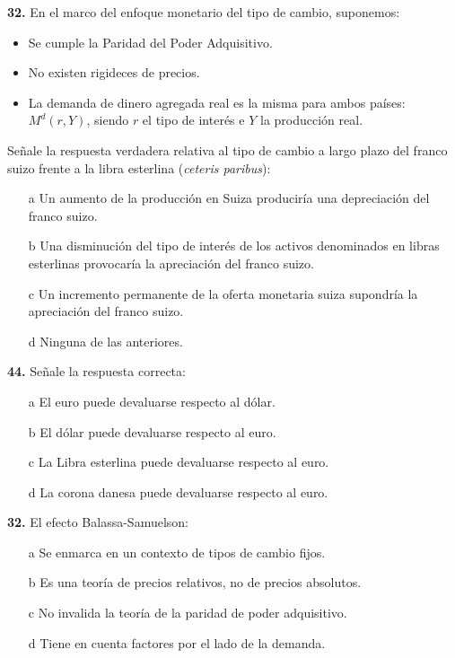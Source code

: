 \documentclass{nuevotema}
\begin{document}
\textbf{32.} En el marco del enfoque monetario del tipo de cambio, suponemos:

\begin{itemize}
	\item Se cumple la Paridad del Poder Adquisitivo.
	\item No existen rigideces de precios.
	\item La demanda de dinero agregada real es la misma para ambos países: $M^d (r, Y)$, siendo $r$ el tipo de interés e $Y$ la producción real.
\end{itemize}

Señale la respuesta verdadera relativa al tipo de cambio a largo plazo del franco suizo frente a la libra esterlina (\textit{ceteris paribus}):
\begin{enumerate}
	\item[a] Un aumento de la producción en Suiza produciría una depreciación del franco suizo.
	\item[b] Una disminución del tipo de interés de los activos denominados en libras esterlinas provocaría la apreciación del franco suizo.
	\item[c] Un incremento permanente de la oferta monetaria suiza supondría la apreciación del franco suizo.
	\item[d] Ninguna de las anteriores.
\end{enumerate}


\textbf{44.} Señale la respuesta correcta:
\begin{enumerate}
	\item[a] El euro puede devaluarse respecto al dólar.
	\item[b] El dólar puede devaluarse respecto al euro.
	\item[c] La Libra esterlina puede devaluarse respecto al euro.
	\item[d] La corona danesa puede devaluarse respecto al euro.
\end{enumerate}

\textbf{32.} El efecto Balassa-Samuelson:
\begin{itemize}
	\item[a] Se enmarca en un contexto de tipos de cambio fijos.
	\item[b] Es una teoría de precios relativos, no de precios absolutos.
	\item[c] No invalida la teoría de la paridad de poder adquisitivo.
	\item[d] Tiene en cuenta factores por el lado de la demanda.
\end{itemize}
\end{document}
